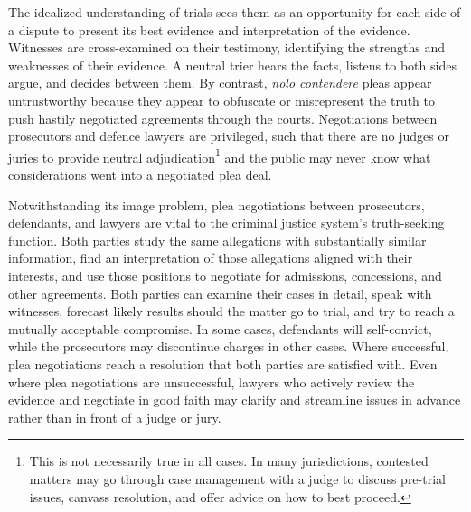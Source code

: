 The idealized understanding of trials sees them as an opportunity for each side of a dispute to present its best evidence and interpretation of the evidence. Witnesses are cross-examined on their testimony, identifying the strengths and weaknesses of their evidence. A neutral trier hears the facts, listens to both sides argue, and decides between them. By contrast, \textit{nolo contendere} pleas appear untrustworthy because they appear to obfuscate or misrepresent the truth to push hastily negotiated agreements through the courts. Negotiations between prosecutors and defence lawyers are privileged, such that there are no judges or juries to provide neutral adjudication\footnote{This is not necessarily true in all cases. In many jurisdictions, contested matters may go through case management with a judge to discuss pre-trial issues, canvass resolution, and offer advice on how to best proceed.} and the public may never know what considerations went into a negotiated plea deal. 

Notwithstanding its image problem, plea negotiations between prosecutors, defendants, and lawyers are vital to the criminal justice system's truth-seeking function. Both parties study the same allegations with substantially similar information, find an interpretation of those allegations aligned with their interests, and use those positions to negotiate for admissions, concessions, and other agreements. Both parties can examine their cases in detail, speak with witnesses, forecast likely results should the matter go to trial, and try to reach a mutually acceptable compromise. In some cases, defendants will self-convict, while the prosecutors may discontinue charges in other cases. Where successful, plea negotiations reach a resolution that both parties are satisfied with. Even where plea negotiations are unsuccessful, lawyers who actively review the evidence and negotiate in good faith may clarify and streamline issues in advance rather than in front of a judge or jury.

